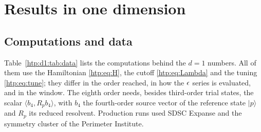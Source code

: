 \section{Results in one dimension}\label{htp:d1:sec}

\subsection{Computations and data}\label{htp:d1:sec:data}
Table~\ref{htp:d1:tab:data} lists the computations behind the $d=1$ numbers. All of them use the Hamiltonian
\eqref{htp:eq:H}, the cutoff \eqref{htp:eq:Lambda} and the tuning \eqref{htp:eq:tune}; they differ in the order reached, in how the
$\epsilon$ series is evaluated, and in the window. The eighth order needs, besides third-order trial states, the scalar
$\langle b_4,R_pb_4\rangle$, with $b_4$ the fourth-order source vector of the reference state $|p\rangle$ and $R_p$ its
reduced resolvent. Production runs used SDSC Expanse and the symmetry cluster of the Perimeter Institute.


